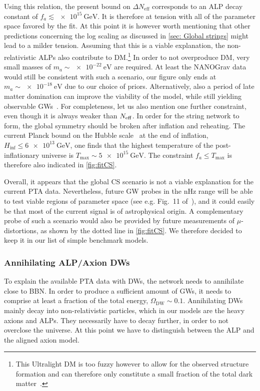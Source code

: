 \documentclass{article}
\newcommand*{\Neff}{\ensuremath{N_\mathrm{eff}}\xspace}
\begin{document}
Using this relation, the present bound on $\Delta \Neff$ corresponds to an ALP decay constant of $f_{a}\lesssim \SI{e15}{\GeV}$. It is therefore at tension with all of the parameter space favored by the fit. At this point it is however worth mentioning that other predictions concerning the log scaling as discussed in \cref{sec: Global strings} might lead to a milder tension. 
Assuming that this is a viable explanation, the non-relativistic ALPs also contribute to DM.\footnote{This Ultralight DM is too fuzzy however to allow for the observed structure formation and can therefore only constitute a small fraction of the total dark matter~\cite{Gorghetto:2021fsn}.} In order to not overproduce DM, very small masses of $m_a\sim \SI{e-22}{\eV}$ are required. At least the NANOGrav data would still be consistent with such a scenario, our figure only ends at $m_a\sim \SI{e-18}{\eV}$ due to our choice of priors. Alternatively, also a period of late matter domination can improve the viability of the model, while still yielding observable GWs~\cite{Ramberg:2019dgi, Chang:2021afa, Gouttenoire:2021jhk,Ghoshal:2023sfa}. For completeness, let us also mention one further constraint, even though it is always weaker than $N_{\rm eff}$. In order for the string network to form, the global symmetry should be broken after inflation and reheating. The current Planck bound on the Hubble scale~\cite{Planck:2018vyg} at the end of inflation, $H_\mathrm{inf} \leq \SI{6e13}{\GeV}$, one finds that the highest temperature of the post-inflationary universe is $T_\mathrm{max} \sim \SI{5e15}{\GeV}$. The constraint $f_{a}\leq T_\mathrm{max}$ is therefore also indicated in \cref{fig:fitCS}. 

Overall, it appears that the global CS scenario is not a viable explanation for the current PTA data. Nevertheless, future GW probes in the nHz range will be able to test viable regions of parameter space (see e.g. Fig.~11 of~\cite{Ramberg:2022irf}), and it could easily be that most of the current signal is of astrophysical origin. A complementary probe of such a scenario would also be provided by future measurements of $\mu$-distortions, as shown by the dotted line in \cref{fig:fitCS}. We therefore decided to keep it in our list of simple benchmark models. 

%
\subsubsection{Annihilating ALP/Axion DWs}\label{sec:ALP_DW_results}
%
To explain the available PTA data with DWs, the network needs to annihilate close to BBN.
In order to produce a sufficient amount of GWs, it needs to comprise at least a fraction of the total energy, $\Omega_\mathrm{DW}\sim 0.1$. 
Annihilating DWs mainly decay into non-relativistic particles, which in our models are the heavy axions and ALPs. They necessarily have to decay further, in order to not overclose the universe. At this point we have to distinguish between the ALP and the aligned axion model. 
\end{document}
